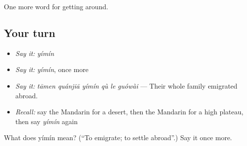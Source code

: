 \begin{grammarlens}[title={What you've built}]
One more word for getting around.
\end{grammarlens}

\subsection*{Your turn}
\begin{itemize}
\raggedright
  \item \emph{Say it:} \emph{yímín}
  \item \emph{Say it:} \emph{yímín}, once more
  \item \emph{Say it:} \emph{tāmen quánjiā yímín qù le guówài} — Their whole family emigrated abroad.
  \item \emph{Recall:} say the Mandarin for a desert, then the Mandarin for a high plateau, then say \emph{yímín} again
\end{itemize}

\begin{tcolorbox}[breakable,colback=teal!4,colframe=teal!35!black,title={Before you move on}]
What does yímín mean? (\textquotedblleft{}To emigrate; to settle abroad\textquotedblright{}.) Say it once more.
\end{tcolorbox}
